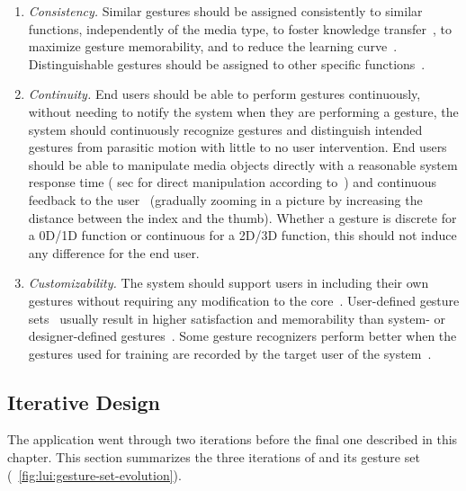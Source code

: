 \begin{enumerate}[noitemsep]
    \item \textit{Consistency.} Similar gestures should be assigned consistently to similar functions, independently of the media type, to foster knowledge transfer~\cite{Dingler:2018}, to maximize gesture memorability, and to reduce the learning curve~\cite{Delamare:2019}. Distinguishable gestures should be assigned to other specific functions~\cite{Kohlsdorf:2013}.
    \item \textit{Continuity.} End users should be able to perform gestures continuously, without needing to notify the system when they are performing a gesture, \ie the system should continuously recognize gestures and distinguish intended gestures from parasitic motion with little to no user intervention. End users should be able to manipulate media objects directly with a reasonable system response time ( sec for direct manipulation according to~\cite{Nielsen:1994}) and continuous feedback to the user~\cite{Aigner:2012} (\eg gradually zooming in a picture by increasing the distance between the index and the thumb). Whether a gesture is discrete for a 0D/1D function or continuous for a 2D/3D function, this should not induce any difference for the end user.
    \item \textit{Customizability.} The system should support users in including their own gestures without requiring any modification to the \lui core~\cite{Coyette:2007}. User-defined gesture sets~\cite{Grijincu:2014} usually result in higher satisfaction and memorability than system- or designer-defined gestures~\cite{Nacenta:2013}. Some gesture recognizers perform better when the gestures used for training are recorded by the target user of the system~\cite{Vatavu:2013}.
\end{enumerate}

\subsection{Iterative Design} \label{sec:lui:description:iterative-design}
The \lui application went through two iterations before the final one described in this chapter. This section summarizes the three iterations of \lui and its gesture set (\fig~\ref{fig:lui:gesture-set-evolution}).

